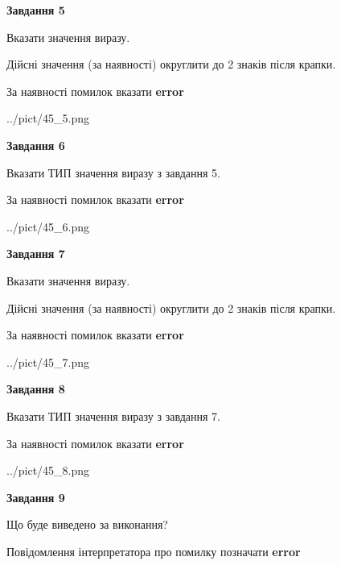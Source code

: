 \documentclass[11pt, ukrainian]{article}
\begin{document}
{\begin {large}
{\begin {center}\textbf{Завдання 5}\end {center}}\par
Вказати значення виразу. \par
Дійсні значення (за наявності) округлити до 2 знаків після крапки. \par
За наявності помилок вказати \textbf{error}

\begin{center}
	{../pict/45_5.png}
\end{center}
\newpage

{\begin {center}\textbf{Завдання 6}\end {center}}\par
Вказати ТИП значення виразу з завдання 5. \par
За наявності помилок вказати \textbf{error}

\begin{center}
	{../pict/45_6.png}
\end{center}
\newpage

{\begin {center}\textbf{Завдання 7}\end {center}}\par
Вказати значення виразу. \par
Дійсні значення (за наявності) округлити до 2 знаків після крапки. \par
За наявності помилок вказати \textbf{error}

\begin{center}
	{../pict/45_7.png}
\end{center}
\newpage

{\begin {center}\textbf{Завдання 8}\end {center}}\par
Вказати ТИП значення виразу з завдання 7. \par
За наявності помилок вказати \textbf{error}

\begin{center}
	{../pict/45_8.png}
\end{center}
\newpage

{\begin {center}\textbf{Завдання 9}\end {center}}\par
Що буде виведено за виконання? \par
Повідомлення інтерпретатора про помилку позначати \textbf{error}


\end{large}}
\end{document}
